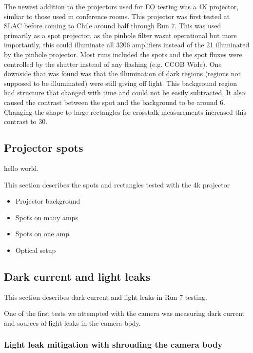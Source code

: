 The newest addition to the projectors used for EO testing was a 4K
projector, simliar to those used in conference rooms. This projector was
first tested at SLAC before coming to Chile around half through Run 7.
This was used primarily as a spot projector, as the pinhole filter
wasn\textquotesingle t operational but more importantly, this could
illuminate all 3206 amplifiers instead of the 21 illuminated by the
pinhole projector. Most runs included the spots and the spot fluxes were
controlled by the shutter instead of any flashing (e.g. CCOB Wide). One
downside that was found was that the illumination of
\textquotesingle dark\textquotesingle{} regions (regions not supposed to
be illuminated) were still giving off light. This background region had
structure that changed with time and could not be easily subtracted. It
also caused the contrast between the spot and the background to be
around 6. Changing the shape to large rectangles for crosstalk
measurements increased this contrast to 30.

\subsection{Projector spots}\label{projector-spots}

hello world.

This section describes the spots and rectangles tested with the 4k
projector

\begin{itemize}
\tightlist
\item
  Projector background
\item
  Spots on many amps
\item
  Spots on one amp
\item
  Optical setup
\end{itemize}

\subsection{Dark current and light
leaks}\label{dark-current-and-light-leaks}

This section describes dark current and light leaks in Run 7 testing.

One of the first tests we attempted with the camera was measuring dark
current and sources of light leaks in the camera body.

\subsubsection{Light leak mitigation with shrouding the camera
body}\label{light-leak-mitigation-with-shrouding-the-camera-body}

